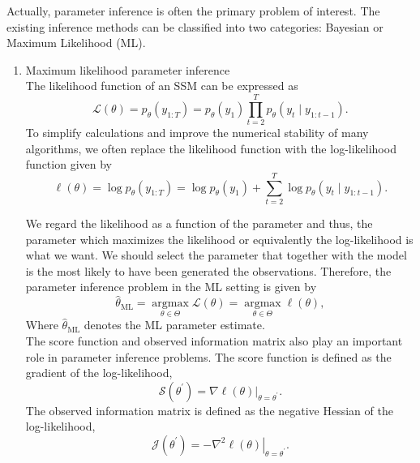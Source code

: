 \documentclass[mstat,12pt]{unswthesis}  %
\numberwithin{equation}{section}
\begin{document}
\noindent Actually, parameter inference is often the primary problem of interest.
The existing inference methods
can be classified into two categories: Bayesian or Maximum Likelihood (ML). \\

\begin{enumerate}
    \item Maximum likelihood parameter inference\\
    
    The likelihood function of an
    SSM can be expressed as 
    \begin{equation}\mathcal{L}(\theta)=p_{\theta}\left(y_{1: T}\right)=p_{\theta}\left(y_{1}\right) \prod_{t=2}^{T} p_{\theta}\left(y_{t} \mid y_{1: t-1}\right).\end{equation}
    To simplify  calculations and improve the numerical stability of many algorithms, we often replace the likelihood function with the log-likelihood function given by
    \begin{equation}\ell(\theta)=\log p_{\theta}\left(y_{1: T}\right)=\log p_{\theta}\left(y_{1}\right)+\sum_{t=2}^{T} \log p_{\theta}\left(y_{t} \mid y_{1: t-1}\right).\end{equation}
    
    We regard the likelihood as a function of the parameter and thus, the parameter which maximizes the likelihood or equivalently the log-likelihood  is what we want. We should select the parameter that together
    with the model is the most likely to have been generated the observations.
    Therefore, the parameter inference problem in the ML setting is given by
    \begin{equation}\label{ML}
    \widehat{\theta}_{\mathrm{ML}}=\underset{\theta \in \Theta}{\operatorname{argmax}} \mathcal{L}(\theta)=\underset{\theta \in \Theta}{\operatorname{argmax}} \ell(\theta),\end{equation}
    Where $\widehat{\theta}_{\mathrm{ML}}$ denotes the ML parameter estimate.\\
    
    The score function and observed information matrix  also play an important role in parameter inference problems. The score function is defined as the gradient of
    the log-likelihood,
    \begin{equation}\mathcal{S}\left(\theta^{\prime}\right)=\left.\nabla \ell(\theta)\right|_{\theta=\theta^{\prime}}.\end{equation}
    The observed information matrix
    is defined as the negative Hessian of the log-likelihood,
    \begin{equation}\mathcal{J}\left(\theta^{\prime}\right)=-\left.\nabla^{2} \ell(\theta)\right|_{\theta=\theta^{\prime}}.
    \end{equation}
    \\
    

\end{enumerate}
\end{document}

